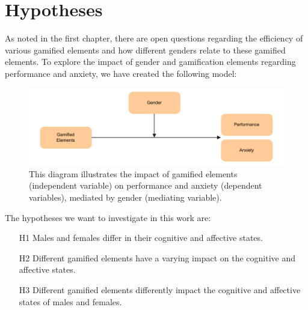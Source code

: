 \section{Hypotheses}

As noted in the first chapter, there are open questions regarding the efficiency of various gamified elements and how different genders relate to these gamified elements.
To explore the impact of gender and gamification elements regarding performance and anxiety, we have created the following model:\newline

\begin{figure}[H]
    \centering
    \includegraphics{img/Hypotheses}
    \caption{This diagram illustrates the impact of gamified elements (independent variable) on performance and anxiety (dependent variables), mediated by gender (mediating variable).}
    \label{fig:figureHypotheses}
\end{figure} The hypotheses we want to investigate in this work are:
\begin{itemize}
    \item[H1] Males and females differ in their cognitive and affective states.
    \item[H2] Different gamified elements have a varying impact on the cognitive and affective states.
    \item[H3] Different gamified elements differently impact the cognitive and affective states of males and females.
\end{itemize}